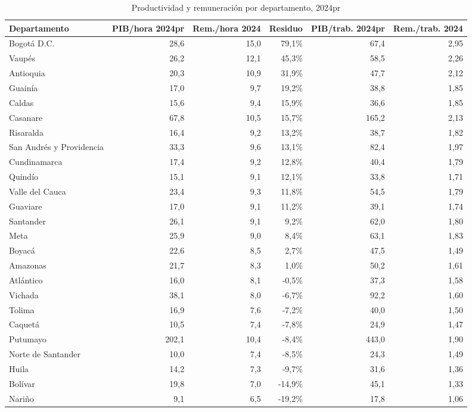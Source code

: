 \begin{table}[H]
\centering
\caption{Productividad y remuneración por departamento, 2024pr}
\label{tab:dept_productividad_remuneracion_33}
\scriptsize
\begin{tabular}{lrrrrr}
\toprule
Departamento & PIB/hora 2024pr & Rem./hora 2024 & Residuo & PIB/trab. 2024pr & Rem./trab. 2024 \\
\midrule
Bogotá D.C. & 28,6 & 15,0 & 79,1\% & 67,4 & 2,95 \\
Vaupés & 26,2 & 12,1 & 45,3\% & 58,5 & 2,26 \\
Antioquia & 20,3 & 10,9 & 31,9\% & 47,7 & 2,12 \\
Guainía & 17,0 & 9,7 & 19,2\% & 38,8 & 1,85 \\
Caldas & 15,6 & 9,4 & 15,9\% & 36,6 & 1,85 \\
Casanare & 67,8 & 10,5 & 15,7\% & 165,2 & 2,13 \\
Risaralda & 16,4 & 9,2 & 13,2\% & 38,7 & 1,82 \\
San Andrés y Providencia & 33,3 & 9,6 & 13,1\% & 82,4 & 1,97 \\
Cundinamarca & 17,4 & 9,2 & 12,8\% & 40,4 & 1,79 \\
Quindío & 15,1 & 9,1 & 12,1\% & 33,8 & 1,71 \\
Valle del Cauca & 23,4 & 9,3 & 11,8\% & 54,5 & 1,79 \\
Guaviare & 17,0 & 9,1 & 11,2\% & 39,1 & 1,74 \\
Santander & 26,1 & 9,1 & 9,2\% & 62,0 & 1,80 \\
Meta & 25,9 & 9,0 & 8,4\% & 63,1 & 1,83 \\
Boyacá & 22,6 & 8,5 & 2,7\% & 47,5 & 1,49 \\
Amazonas & 21,7 & 8,3 & 1,0\% & 50,2 & 1,61 \\
Atlántico & 16,0 & 8,1 & -0,5\% & 37,3 & 1,58 \\
Vichada & 38,1 & 8,0 & -6,7\% & 92,2 & 1,60 \\
Tolima & 16,9 & 7,6 & -7,2\% & 40,0 & 1,50 \\
Caquetá & 10,5 & 7,4 & -7,8\% & 24,9 & 1,47 \\
Putumayo & 202,1 & 10,4 & -8,4\% & 443,0 & 1,90 \\
Norte de Santander & 10,0 & 7,4 & -8,5\% & 24,3 & 1,49 \\
Huila & 14,2 & 7,3 & -9,7\% & 31,6 & 1,36 \\
Bolívar & 19,8 & 7,0 & -14,9\% & 45,1 & 1,33 \\
Nariño & 9,1 & 6,5 & -19,2\% & 17,8 & 1,06 \\

\end{tabular}
\end{table}
